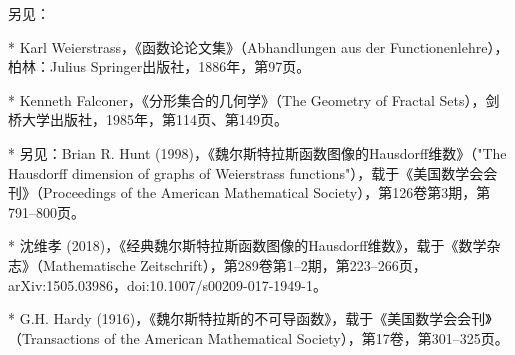 \begin{enumerate}
另见：

* Karl Weierstrass，《函数论论文集》（Abhandlungen aus der Functionenlehre），柏林：Julius Springer出版社，1886年，第97页。

* Kenneth Falconer，《分形集合的几何学》（The Geometry of Fractal Sets），剑桥大学出版社，1985年，第114页、第149页。

* 另见：Brian R. Hunt (1998)，《魏尔斯特拉斯函数图像的Hausdorff维数》（"The Hausdorff dimension of graphs of Weierstrass functions"），载于《美国数学会会刊》（Proceedings of the American Mathematical Society），第126卷第3期，第791–800页。

* 沈维孝 (2018)，《经典魏尔斯特拉斯函数图像的Hausdorff维数》，载于《数学杂志》（Mathematische Zeitschrift），第289卷第1–2期，第223–266页，arXiv:1505.03986，doi:10.1007/s00209-017-1949-1。

* G.H. Hardy (1916)，《魏尔斯特拉斯的不可导函数》，载于《美国数学会会刊》（Transactions of the American Mathematical Society），第17卷，第301–325页。

\end{enumerate}